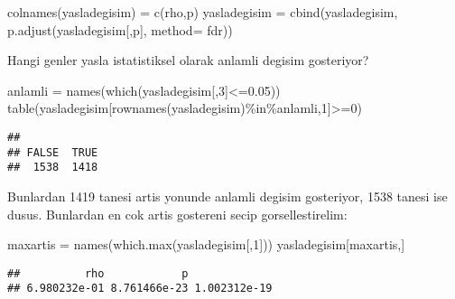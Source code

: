 \documentclass[
]{book}
\newenvironment{Shaded}{\begin{snugshade}}{\end{snugshade}}
\newcommand{\AttributeTok}[1]{\textcolor[rgb]{0.77,0.63,0.00}{#1}}
\newcommand{\DecValTok}[1]{\textcolor[rgb]{0.00,0.00,0.81}{#1}}
\newcommand{\FloatTok}[1]{\textcolor[rgb]{0.00,0.00,0.81}{#1}}
\newcommand{\FunctionTok}[1]{\textcolor[rgb]{0.00,0.00,0.00}{#1}}
\newcommand{\NormalTok}[1]{#1}
\newcommand{\OtherTok}[1]{\textcolor[rgb]{0.56,0.35,0.01}{#1}}
\newcommand{\SpecialCharTok}[1]{\textcolor[rgb]{0.00,0.00,0.00}{#1}}
\newcommand{\StringTok}[1]{\textcolor[rgb]{0.31,0.60,0.02}{#1}}
\begin{document}
\begin{Shaded}
\begin{Highlighting}[]
\FunctionTok{colnames}\NormalTok{(yasladegisim) }\OtherTok{=} \FunctionTok{c}\NormalTok{(}\StringTok{\textquotesingle{}rho\textquotesingle{}}\NormalTok{,}\StringTok{\textquotesingle{}p\textquotesingle{}}\NormalTok{)}
\NormalTok{yasladegisim }\OtherTok{=} \FunctionTok{cbind}\NormalTok{(yasladegisim, }\FunctionTok{p.adjust}\NormalTok{(yasladegisim[,}\StringTok{\textquotesingle{}p\textquotesingle{}}\NormalTok{], }\AttributeTok{method=} \StringTok{\textquotesingle{}fdr\textquotesingle{}}\NormalTok{))}
\end{Highlighting}
\end{Shaded}

Hangi genler yasla istatistiksel olarak anlamli degisim gosteriyor?

\begin{Shaded}
\begin{Highlighting}[]
\NormalTok{anlamli }\OtherTok{=} \FunctionTok{names}\NormalTok{(}\FunctionTok{which}\NormalTok{(yasladegisim[,}\DecValTok{3}\NormalTok{]}\SpecialCharTok{\textless{}=}\FloatTok{0.05}\NormalTok{))}
\FunctionTok{table}\NormalTok{(yasladegisim[}\FunctionTok{rownames}\NormalTok{(yasladegisim)}\SpecialCharTok{\%in\%}\NormalTok{anlamli,}\DecValTok{1}\NormalTok{]}\SpecialCharTok{\textgreater{}=}\DecValTok{0}\NormalTok{)}
\end{Highlighting}
\end{Shaded}

\begin{verbatim}
## 
## FALSE  TRUE 
##  1538  1418
\end{verbatim}

Bunlardan 1419 tanesi artis yonunde anlamli degisim gosteriyor, 1538 tanesi ise dusus. Bunlardan en cok artis gostereni secip gorsellestirelim:

\begin{Shaded}
\begin{Highlighting}[]
\NormalTok{maxartis }\OtherTok{=} \FunctionTok{names}\NormalTok{(}\FunctionTok{which.max}\NormalTok{(yasladegisim[,}\DecValTok{1}\NormalTok{]))}
\NormalTok{yasladegisim[maxartis,]}
\end{Highlighting}
\end{Shaded}

\begin{verbatim}
##          rho            p              
## 6.980232e-01 8.761466e-23 1.002312e-19
\end{verbatim}
\end{document}
